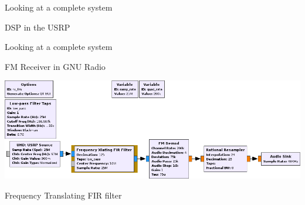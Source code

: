 \documentclass{beamer}
\begin{document}
\begin{frame}{Looking at a complete system}

  DSP in the USRP \bigskip

  

\end{frame}

\begin{frame}{Looking at a complete system}

  FM Receiver in GNU Radio \bigskip

  {\includegraphics[width=\textwidth]{fg_xlating_fir}}


  Frequency Translating FIR filter

\end{frame}
\end{document}
